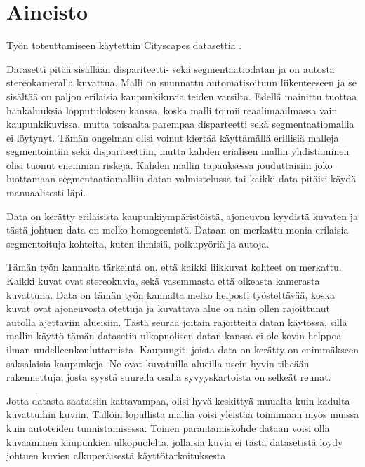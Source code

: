 \chapter{Aineisto}%
\label{ch:aineisto}

Työn toteuttamiseen käytettiin Cityscapes datasettiä \cite{Cordts2016Cityscapes}.


Datasetti pitää sisällään dispariteetti- sekä segmentaatiodatan ja on autosta stereokameralla kuvattua.
Malli on suunnattu automatisoituun liikenteeseen ja se sisältää on paljon erilaisia kaupunkikuvia teiden varsilta.
Edellä mainittu tuottaa hankaluuksia lopputuloksen kanssa, koska malli toimii reaalimaailmassa vain kaupunkikuvissa,
mutta toisaalta parempaa disparteetti sekä segmentaatiomallia ei löytynyt. 
Tämän ongelman olisi voinut kiertää käyttämällä erillisiä malleja segmentointiin sekä dispariteettiin,
mutta kahden erialisen mallin yhdistäminen olisi tuonut enemmän riskejä.
Kahden mallin tapauksessa jouduttaisiin joko luottamaan segmentaatiomalliin datan valmistelussa 
tai kaikki data pitäisi käydä manuaalisesti läpi.

Data on kerätty erilaisista kaupunkiympäristöistä, ajoneuvon kyydistä kuvaten ja tästä johtuen data on melko homogeenistä.
Dataan on merkattu monia erilaisia segmentoituja kohteita, kuten ihmisiä, polkupyöriä ja autoja.

Tämän työn kannalta tärkeintä on, että kaikki liikkuvat kohteet on merkattu.
Kaikki kuvat ovat stereokuvia, sekä vasemmasta että oikeasta kamerasta kuvattuna.
Data on tämän työn kannalta melko helposti työstettävää, koska kuvat ovat ajoneuvosta otettuja ja kuvattava alue on näin ollen rajoittunut autolla ajettaviin alueisiin.
Tästä seuraa joitain rajoitteita datan käytössä, sillä mallin käyttö tämän datasetin ulkopuolisen datan kanssa ei ole kovin helppoa ilman uudelleenkouluttamista.
Kaupungit, joista data on kerätty on enimmäkseen saksalaisia kaupunkeja.
Ne ovat kuvatuilla alueilla usein hyvin tiheään rakennettuja, josta syystä suurella osalla syvyyskartoista on selkeät reunat.

Jotta datasta saataisiin kattavampaa, olisi hyvä keskittyä muualta kuin kadulta kuvattuihin kuviin.
Tällöin lopullista mallia voisi yleistää toimimaan myös muissa kuin autoteiden tunnistamisessa.
Toinen parantamiskohde dataan voisi olla kuvaaminen kaupunkien ulkopuolelta,
jollaisia kuvia ei tästä datasetistä löydy johtuen kuvien alkuperäisestä käyttötarkoituksesta


